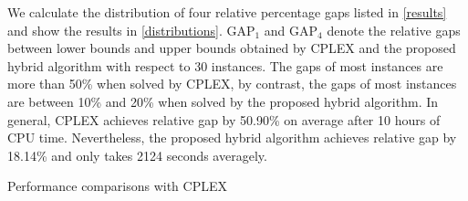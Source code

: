 \documentclass[11pt,nonblindrev,fleqn]{article}
\begin{document}
We calculate the distribution of four relative percentage gaps listed in \autoref{results} and show the results in \autoref{distributions}. GAP$_1$ and GAP$_4$ denote the relative gaps between lower bounds and upper bounds obtained by CPLEX and the proposed hybrid algorithm with respect to 30 instances. The gaps of most instances are more than 50\% when solved by CPLEX, by contrast, the gaps of most instances are between 10\% and 20\% when solved by the proposed hybrid algorithm. In general, CPLEX achieves relative gap by 50.90\% on average after 10 hours of CPU time. Nevertheless, the proposed hybrid algorithm achieves relative gap by 18.14\% and only takes 2124 seconds averagely.

\begin{table}[H]
\setlength{\abovecaptionskip}{-3pt}
\setlength{\belowcaptionskip}{5pt}
\centering
  \footnotesize
  \caption{Performance comparisons with CPLEX}
  \label{results}


\end{table}
\end{document}
